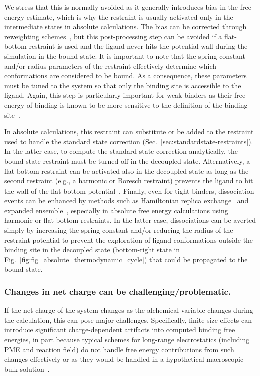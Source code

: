 \documentclass[9pt,bestpractices]{livecoms}
\begin{document}
We stress that this is normally avoided as it generally introduces bias in the free energy estimate, which is why the restraint is usually activated only in the intermediate states in absolute calculations.
The bias can be corrected through reweighting schemes~\cite{rizzi2019sampl6}, but this post-processing step can be avoided if a flat-bottom restraint is used and the ligand never hits the potential wall during the simulation in the bound state.
It is important to note that the spring constant and/or radius parameters of the restraint effectively determine which conformations are considered to be bound.
As a consequence, these parameters must be tuned to the system so that only the binding site is accessible to the ligand.
Again, this step is particularly important for weak binders as their free energy of binding is known to be more sensitive to the definition of the binding site~\cite{gilson1997statisticalthermodynamic}.

In absolute calculations, this restraint can substitute or be added to the restraint used to handle the standard state correction (Sec.~\ref{sec:standardstate-restraints}).
In the latter case, to compute the standard state correction analytically, the bound-state restraint must be turned off in the decoupled state.
Alternatively, a flat-bottom restraint can be activated also in the decoupled state as long as the second restraint (e.g., a harmonic or Boresch restraint) prevents the ligand to hit the wall of the flat-bottom potential~\cite{rizzi2019sampl6}.
Finally, even for tight binders, dissociation events can be enhanced by methods such as Hamiltonian replica exchange~\cite{sugita2000multidimensionala,chodera2011replica,wang2013identifying} and expanded ensemble~\cite{lyubartsev1992newa,li2007simulated}, especially in absolute free energy calculations using harmonic or flat-bottom restraints.
In the latter case, dissociations can be averted simply by increasing the spring constant and/or reducing the radius of the restraint potential to prevent the exploration of ligand conformations outside the binding site in the decoupled state (bottom-right state in Fig.~\ref{fig:fig_absolute_thermodynamic_cycle}) that could be propagated to the bound state.

\subsubsection{Changes in net charge can be challenging/problematic.}
If the net charge of the system changes as the alchemical variable changes during the  calculation, this can pose major challenges.
Specifically, finite-size effects can introduce significant charge-dependent artifacts into computed binding free energies, in part because typical schemes for long-range electrostatics (including PME and reaction field) do not handle free energy contributions from such changes effectively or as they would be handled in a hypothetical macroscopic bulk solution~\cite{lin2014overview, ohlknecht2020correcting, rocklin2013calculating}.
\end{document}
